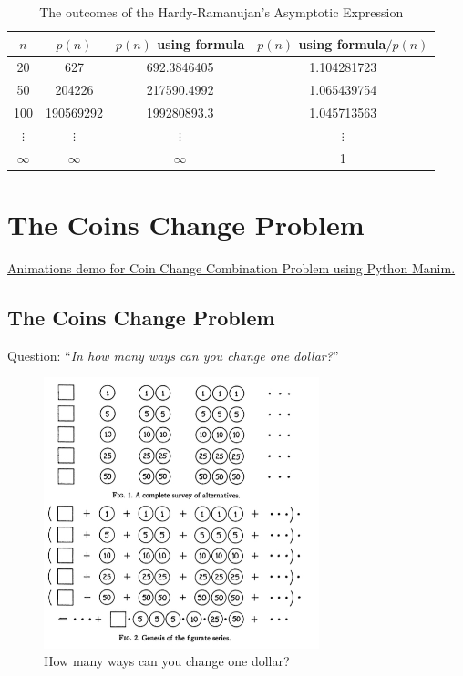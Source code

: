 \documentclass{article}
\theoremstyle{definition}
\theoremstyle{question}
\begin{document}
\begin{table}[h!] 
    \centering %
    \begin{tabular}{|c|c|c|c|}
        \hline
        $n$ & $p(n)$ & $p(n)$ using formula & $p(n)$ using formula$/p(n)$ \\
        \hline
        20 & 627 & 692.3846405 & 1.104281723 \\
        50 & 204226 & 217590.4992 & 1.065439754 \\
        100 & 190569292 & 199280893.3 & 1.045713563 \\
        $\vdots$ & $\vdots$ & $\vdots$ & $\vdots$ \\
        $\infty$ & $\infty$ & $\infty$ & 1 \\
        \hline
    \end{tabular}
    \caption{The outcomes of the Hardy-Ramanujan’s Asymptotic Expression} 
\end{table}


\newpage
\section{The Coins Change Problem}
    \noindent \href{https://youtu.be/PmR1eRswj3A}{Animations demo for Coin Change Combination Problem using Python Manim.}\cite{manim}

    \subsection{The Coins Change Problem}
    \begin{center}
        Question:
        “\textit{In how many ways can you change one dollar?}” \cite{gpolya1956}
    \end{center}
    
    \begin{figure}[h!]
        \centering
        \includegraphics[width=8cm]{images/coins-change.jpg}
        \caption{How many ways can you change one dollar?}
    \end{figure}
    
\end{document}
